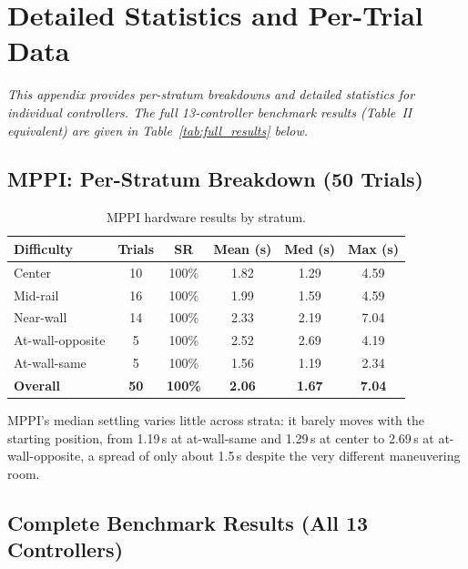 \section{Detailed Statistics and Per-Trial Data}
\label{appendix:per_trial}

\noindent\textit{This appendix provides per-stratum breakdowns and detailed statistics
for individual controllers. The full 13-controller benchmark results
(Table~II equivalent) are given in Table~\ref{tab:full_results} below.}

\subsection{MPPI: Per-Stratum Breakdown (50 Trials)}

\begin{table}[t]
\centering
\caption{MPPI hardware results by stratum.}
\begin{tabular}{lccccc}
\toprule
\textbf{Difficulty} & \textbf{Trials} & \textbf{SR} & \textbf{Mean (s)} & \textbf{Med (s)} & \textbf{Max (s)} \\
\midrule
Center & 10 & 100\% & 1.82 & 1.29 & 4.59 \\
Mid-rail & 16 & 100\% & 1.99 & 1.59 & 4.59 \\
Near-wall & 14 & 100\% & 2.33 & 2.19 & 7.04 \\
At-wall-opposite & 5 & 100\% & 2.52 & 2.69 & 4.19 \\
At-wall-same & 5 & 100\% & 1.56 & 1.19 & 2.34 \\
\midrule
\textbf{Overall} & \textbf{50} & \textbf{100\%} & \textbf{2.06} & \textbf{1.67} & \textbf{7.04} \\
\bottomrule
\end{tabular}
\end{table}

MPPI's median settling varies little across strata: it barely
moves with the starting position, from 1.19\,s at at-wall-same and 1.29\,s at
center to 2.69\,s at at-wall-opposite, a spread of only about 1.5\,s despite
the very different maneuvering room.

\subsection{Complete Benchmark Results (All 13 Controllers)}

